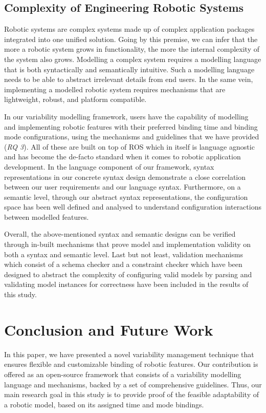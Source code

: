 \documentclass[conference]{IEEEtran}
\begin{document}
\subsection{Complexity of Engineering Robotic Systems}
Robotic systems are complex systems made up of complex application packages integrated into one unified solution. Going by this premise, we can infer that the more a robotic system grows in functionality, the more the internal complexity of the system also grows. Modelling a complex system requires a modelling language that is both syntactically and semantically intuitive. Such a modelling language needs to be able to abstract irrelevant details from end users. In the same vein, implementing a modelled robotic system requires mechanisms that are lightweight, robust, and platform compatible.

In our variability modelling framework, users have the capability of modelling and implementing robotic features with their preferred binding time and binding mode configurations, using the mechanisms and guidelines that we have provided (\textit{RQ 3}). All of these are built on top of ROS which in itself is language agnostic and has become the de-facto standard when it comes to robotic application development. In the language component of our framework, syntax representations in our concrete syntax design demonstrate a close correlation between our user requirements and our language syntax. Furthermore, on a semantic level, through our abstract syntax representations, the configuration space has been well defined and analysed to understand configuration interactions between modelled features.

Overall, the above-mentioned syntax and semantic designs can be verified through in-built mechanisms that prove model and implementation validity on both a syntax and semantic level. Last but not least, validation mechanisms which consist of a schema checker and a constraint checker which have been designed to abstract the complexity of configuring valid models by parsing and validating model instances for correctness have been included in the results of this study.

\section{Conclusion and Future Work}
In this paper, we have presented a novel variability management technique that ensures flexible and customizable binding of robotic features. Our contribution is offered as an open-source framework that consists of a variability modelling language and mechanisms, backed by a set of comprehensive guidelines. Thus, our main research goal in this study is to provide proof of the feasible adaptability of a robotic model, based on its assigned time and mode bindings. 
\end{document}
